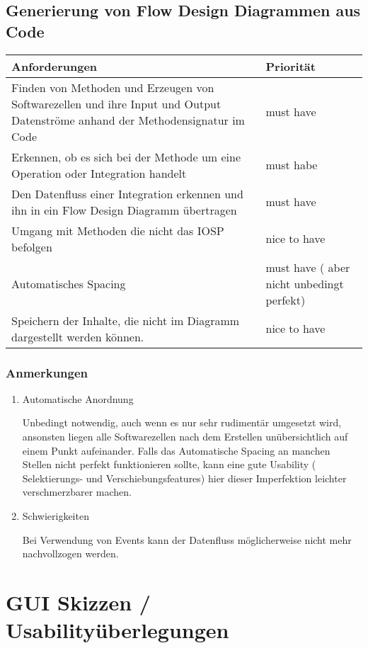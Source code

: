 \subsection{Generierung von Flow Design Diagrammen aus Code}


\begin{center}
\begin{tabular}{ll}
Anforderungen & Priorität\\
\hline
Finden von Methoden und Erzeugen von Softwarezellen und ihre Input und Output Datenströme anhand der Methodensignatur im Code & must have\\
Erkennen, ob es sich bei der Methode um eine Operation oder Integration handelt & must habe\\
Den Datenfluss einer Integration erkennen und ihn in ein Flow Design Diagramm übertragen & must have\\
Umgang mit Methoden die nicht das IOSP befolgen & nice to have\\
Automatisches Spacing & must have ( aber nicht unbedingt perfekt)\\
Speichern der Inhalte, die nicht im Diagramm dargestellt werden können. & nice to have\\
\end{tabular}
\end{center}

\subsubsection{Anmerkungen}

\begin{enumerate}
\item Automatische Anordnung

Unbedingt notwendig, auch wenn es nur sehr rudimentär umgesetzt wird, ansonsten liegen
alle Softwarezellen nach dem Erstellen unübersichtlich auf einem Punkt aufeinander.
Falls das Automatische Spacing an manchen Stellen nicht perfekt funktionieren
sollte, kann eine gute Usability ( Selektierungs- und Verschiebungsfeatures)
hier dieser Imperfektion leichter verschmerzbarer machen.

\item Schwierigkeiten

Bei Verwendung von Events kann der Datenfluss möglicherweise nicht mehr
nachvollzogen werden.
\end{enumerate}


\section{GUI Skizzen / Usabilityüberlegungen}


